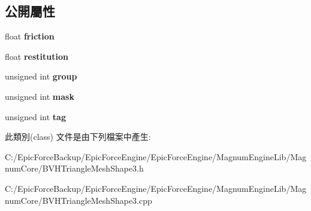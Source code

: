 \subsection*{公開屬性}
\begin{DoxyCompactItemize}
\item 
float {\bfseries friction}\hypertarget{class_magnum_1_1_b_v_h_triangle_mesh_shape3_1_1_custom_material_a6bb54ccc867401c58e8defcbb8db262f}{}\label{class_magnum_1_1_b_v_h_triangle_mesh_shape3_1_1_custom_material_a6bb54ccc867401c58e8defcbb8db262f}

\item 
float {\bfseries restitution}\hypertarget{class_magnum_1_1_b_v_h_triangle_mesh_shape3_1_1_custom_material_a428a92bcf1ff33c49c2b1f15df6488d0}{}\label{class_magnum_1_1_b_v_h_triangle_mesh_shape3_1_1_custom_material_a428a92bcf1ff33c49c2b1f15df6488d0}

\item 
unsigned int {\bfseries group}\hypertarget{class_magnum_1_1_b_v_h_triangle_mesh_shape3_1_1_custom_material_aa847796516a4427fcb7ac646e4f518da}{}\label{class_magnum_1_1_b_v_h_triangle_mesh_shape3_1_1_custom_material_aa847796516a4427fcb7ac646e4f518da}

\item 
unsigned int {\bfseries mask}\hypertarget{class_magnum_1_1_b_v_h_triangle_mesh_shape3_1_1_custom_material_aa381e7ef8680aa0f2a2919e553190363}{}\label{class_magnum_1_1_b_v_h_triangle_mesh_shape3_1_1_custom_material_aa381e7ef8680aa0f2a2919e553190363}

\item 
unsigned int {\bfseries tag}\hypertarget{class_magnum_1_1_b_v_h_triangle_mesh_shape3_1_1_custom_material_a9ffe842b2240460f4913e6ee5134ccaf}{}\label{class_magnum_1_1_b_v_h_triangle_mesh_shape3_1_1_custom_material_a9ffe842b2240460f4913e6ee5134ccaf}

\end{DoxyCompactItemize}


此類別(class) 文件是由下列檔案中產生\+:\begin{DoxyCompactItemize}
\item 
C\+:/\+Epic\+Force\+Backup/\+Epic\+Force\+Engine/\+Epic\+Force\+Engine/\+Magnum\+Engine\+Lib/\+Magnum\+Core/B\+V\+H\+Triangle\+Mesh\+Shape3.\+h\item 
C\+:/\+Epic\+Force\+Backup/\+Epic\+Force\+Engine/\+Epic\+Force\+Engine/\+Magnum\+Engine\+Lib/\+Magnum\+Core/B\+V\+H\+Triangle\+Mesh\+Shape3.\+cpp\end{DoxyCompactItemize}

